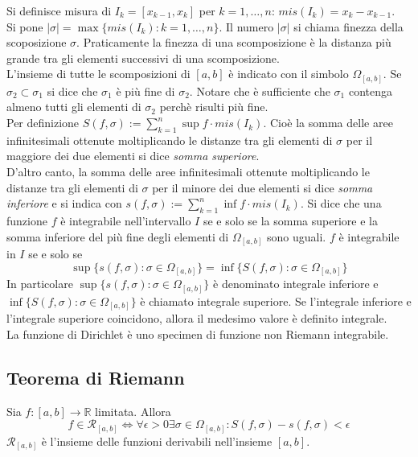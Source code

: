 \documentclass{article}
\begin{document}
Si definisce misura di $I_k=[x_{k-1}, x_k]$ per $k=1, \dots , n$: $mis(I_k)=x_k-x_{k-1}$.\\
Si pone $|\sigma|=\max\{mis(I_k):k=1, \dots, n\}$. Il numero $|\sigma|$ si chiama finezza della scoposizione $\sigma$. Praticamente la finezza di una scomposizione è la distanza più grande tra gli elementi successivi di una scomposizione.\\
\noindent L'insieme di tutte le scomposizioni di $[a,b]$ è indicato con il simbolo $\Omega_{[a,b]}$. Se $\sigma_2 \subset \sigma_1$ si dice che $\sigma_1$ è più fine di $\sigma_2$. Notare che è sufficiente che $\sigma_1$ contenga almeno tutti gli elementi di $\sigma_2$ perchè risulti più fine.\\
Per definizione $S(f, \sigma):= \sum^n_{k=1}\sup f \cdot mis(I_k)$. Cioè la somma delle aree infinitesimali ottenute moltiplicando le distanze tra gli elementi di $\sigma$ per il maggiore dei due elementi si dice \textit{somma superiore}.\\
\noindent D'altro canto, la somma delle aree infinitesimali ottenute moltiplicando le distanze tra gli elementi di $\sigma$ per il minore dei due elementi si dice \textit{somma inferiore} e si indica con $s(f,\sigma):=\sum^n_{k=1}\inf f \cdot mis(I_k)$. Si dice che una funzione $f$ è integrabile nell'intervallo $I$ se e solo se la somma superiore e la somma inferiore del più fine degli elementi di $\Omega_{[a,b]}$ sono uguali. $f$ è integrabile in $I$ se e solo se
\begin{equation*}
	\sup\{s(f,\sigma): \sigma \in \Omega_{[a,b]}\}=\inf\{S(f,\sigma): \sigma \in \Omega_{[a,b]}\}
\end{equation*}
In particolare $\sup\{s(f,\sigma): \sigma \in \Omega_{[a,b]}\}$ è denominato integrale inferiore e $\inf\{S(f,\sigma): \sigma \in \Omega_{[a,b]}\}$ è chiamato integrale superiore. Se l'integrale inferiore e l'integrale superiore coincidono, allora il medesimo valore è definito integrale.\\
La funzione di Dirichlet è uno specimen di funzione non Riemann integrabile.

\subsection{Teorema di Riemann}
Sia $f:[a,b]\rightarrow \mathbb{R}$ limitata. Allora
\begin{equation*}
	f \in \mathcal{R}_{[a,b]} \iff \forall \epsilon > 0 \exists \sigma \in \Omega_{[a,b]}: S(f, \sigma )-s(f, \sigma )<\epsilon
\end{equation*}
$\mathcal{R}_{[a,b]}$ è l'insieme delle funzioni derivabili nell'insieme $[a,b]$.
\end{document}
